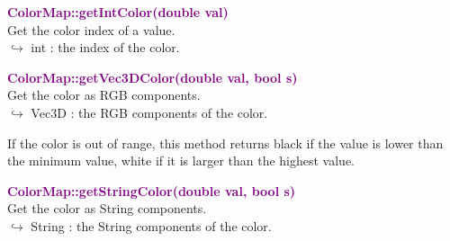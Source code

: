 \textcolor{purple}{\textbf{ColorMap::getIntColor(double val)}}\label{ColorMap::getIntColor(double val)}\\
Get the color index of a value.\\ \hspace*{10mm}$\hookrightarrow$  int : the index of the color.

\begin{tcolorbox}[width=\textwidth,myArgs,tabularx={ll|R}]

\end{tcolorbox}


\textcolor{purple}{\textbf{ColorMap::getVec3DColor(double val, bool s)}}\label{ColorMap::getVec3DColor(double val, bool s)}\\
Get the color as RGB components.\\ \hspace*{10mm}$\hookrightarrow$  Vec3D : the RGB components of the color.

\begin{tcolorbox}[width=\textwidth,myArgs,tabularx={ll|R}]


\end{tcolorbox}

If the color is out of range, this method returns black if the value is lower than the minimum value, white if it is larger than the highest value.

\textcolor{purple}{\textbf{ColorMap::getStringColor(double val, bool s)}}\label{ColorMap::getStringColor(double val, bool s)}\\
Get the color as String components.\\ \hspace*{10mm}$\hookrightarrow$  String : the String components of the color.

